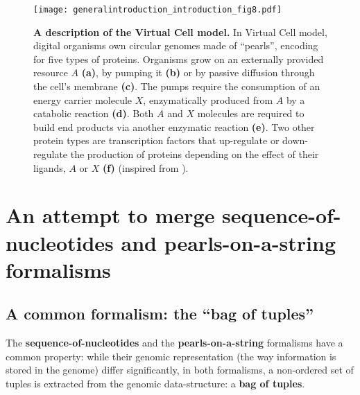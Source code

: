 \begin{figure}
\centering
\texttt{[image: generalintroduction\_introduction\_fig8.pdf]}
\caption[A description of the Virtual Cell model.]{{\bf A description of the Virtual Cell model.}
In Virtual Cell model, digital organisms own circular genomes made of ``pearls'', encoding for five types of proteins. Organisms grow on an externally provided resource $A$ \textbf{(a)}, by pumping it \textbf{(b)} or by passive diffusion through the cell's membrane \textbf{(c)}. The pumps require the consumption of an energy carrier molecule $X$, enzymatically produced from $A$ by a catabolic reaction \textbf{(d)}. Both $A$ and $X$ molecules are required to build end products via another enzymatic reaction \textbf{(e)}. Two other protein types are transcription factors that up-regulate or down-regulate the production of proteins depending on the effect of their ligands, $A$ or $X$ \textbf{(f)} (inspired from \citealt{cuypers-hogeweg-2012}).}
\label{fig:general_introduction:introduction:fig8}
\end{figure}

\section{An attempt to merge sequence-of-nucleotides and pearls-on-a-string formalisms}
\label{sec:general_introduction:introduction:bag_of_tuples}

\subsection{A common formalism: the ``bag of tuples''}

The \textbf{sequence-of-nucleotides} and the \textbf{pearls-on-a-string} formalisms have a common property: while their genomic representation (the way information is stored in the genome) differ significantly, in both formalisms, a non-ordered set of tuples is extracted from the genomic data-structure: a \textbf{bag of tuples}.

